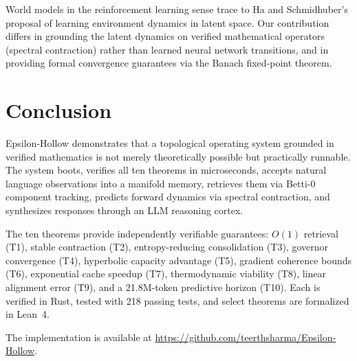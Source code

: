 \documentclass[11pt, a4paper]{article}
\theoremstyle{proofform}
\numberwithin{innerpoints}{subsection}
\numberwithin{disproof}{subsection}
\theoremstyle{mathproof}
\begin{document}
World models in the reinforcement learning sense trace to Ha and Schmidhuber's proposal of learning environment dynamics in latent space. Our contribution differs in grounding the latent dynamics on verified mathematical operators (spectral contraction) rather than learned neural network transitions, and in providing formal convergence guarantees via the Banach fixed-point theorem.

\section{Conclusion}
\label{sec:conclusion}

Epsilon-Hollow demonstrates that a topological operating system grounded in verified mathematics is not merely theoretically possible but practically runnable. The system boots, verifies all ten theorems in microseconds, accepts natural language observations into a manifold memory, retrieves them via Betti-0 component tracking, predicts forward dynamics via spectral contraction, and synthesizes responses through an LLM reasoning cortex.

The ten theorems provide independently verifiable guarantees: $O(1)$ retrieval (T1), stable contraction (T2), entropy-reducing consolidation (T3), governor convergence (T4), hyperbolic capacity advantage (T5), gradient coherence bounds (T6), exponential cache speedup (T7), thermodynamic viability (T8), linear alignment error (T9), and a 21.8M-token predictive horizon (T10). Each is verified in Rust, tested with 218 passing tests, and select theorems are formalized in Lean~4.

The implementation is available at \url{https://github.com/teerthsharma/Epsilon-Hollow}.



\end{document}
